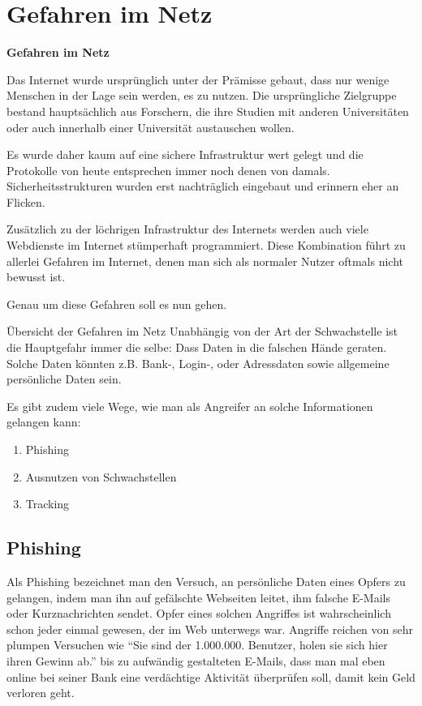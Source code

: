 \documentclass[hyperref={colorlinks,linkcolor=white}, utf8]{beamer}
\begin{document}
	\section{Gefahren im Netz}
	\begin{frame}
		\centering \huge \textbf{Gefahren im Netz}
	\end{frame}
	
	\begin{frame}
		Das Internet wurde ursprünglich unter der Prämisse gebaut, dass nur wenige Menschen in der Lage sein werden, es zu nutzen. Die ursprüngliche Zielgruppe bestand hauptsächlich aus Forschern, die ihre Studien mit anderen Universitäten oder auch innerhalb einer Universität austauschen wollen.
		
		Es wurde daher kaum auf eine sichere Infrastruktur wert gelegt und die Protokolle von heute entsprechen immer noch denen von damals. Sicherheitsstrukturen wurden erst nachträglich eingebaut und erinnern eher an Flicken.
	\end{frame}

	\begin{frame}
		Zusätzlich zu der löchrigen Infrastruktur des Internets werden auch viele Webdienste im Internet stümperhaft programmiert. Diese Kombination führt zu allerlei Gefahren im Internet, denen man sich als normaler Nutzer oftmals nicht bewusst ist.
		
		Genau um diese Gefahren soll es nun gehen.
	\end{frame}

	\begin{frame}{Übersicht der Gefahren im Netz}
		Unabhängig von der Art der Schwachstelle ist die Hauptgefahr immer die selbe: Dass Daten in die falschen Hände geraten. Solche Daten könnten z.B. Bank-, Login-, oder Adressdaten sowie allgemeine persönliche Daten sein. 
		
		Es gibt zudem viele Wege, wie man als Angreifer an solche Informationen gelangen kann:
		\begin{enumerate}
			\item Phishing
			\item Ausnutzen von Schwachstellen
			\item Tracking			
		\end{enumerate}
	\end{frame}

	\subsection{Phishing}
	\begin{frame}
		Als Phishing bezeichnet man den Versuch, an persönliche Daten eines Opfers zu gelangen, indem man ihn auf gefälschte Webseiten leitet, ihm falsche E-Mails oder Kurznachrichten sendet.
		Opfer eines solchen Angriffes ist wahrscheinlich schon jeder einmal gewesen, der im Web unterwegs war. Angriffe reichen von sehr plumpen Versuchen wie \enquote{Sie sind der 1.000.000. Benutzer, holen sie sich hier ihren Gewinn ab.} bis zu aufwändig gestalteten E-Mails, dass man mal eben online bei seiner Bank eine verdächtige Aktivität überprüfen soll, damit kein Geld verloren geht.
	\end{frame}
\end{document}
